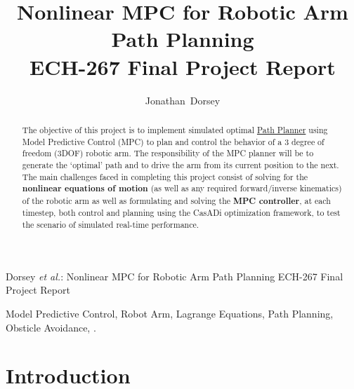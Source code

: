 \documentclass[journal]{IEEEtran}
\begin{document}
\title{Nonlinear MPC for Robotic Arm Path Planning \\ ECH-267 Final Project Report}


\author{Jonathan~Dorsey}



%
{Dorsey \MakeLowercase{\textit{et al.}}: Nonlinear MPC for Robotic Arm Path Planning ECH-267 Final Project Report}

\maketitle

\begin{abstract}
  The objective of this project is to implement simulated optimal \underline{Path Planner} using Model Predictive Control (MPC) to plan and control the behavior of a 3 degree of freedom (3DOF) robotic arm. The responsibility of the MPC planner will be to generate the `optimal' path and to drive the arm from its current position to the next. The main challenges faced in completing this project consist of solving for the \textbf{nonlinear equations of motion} (as well as any required forward/inverse kinematics) of the robotic arm as well as formulating and solving the \textbf{MPC controller}, at each timestep, both control and planning using the CasADi optimization framework, to test the scenario of simulated real-time performance.
\end{abstract}

\begin{IEEEkeywords}
Model Predictive Control, Robot Arm, Lagrange Equations, Path Planning, Obsticle Avoidance, .
\end{IEEEkeywords}


\IEEEpeerreviewmaketitle

\section{Introduction}
\end{document}
